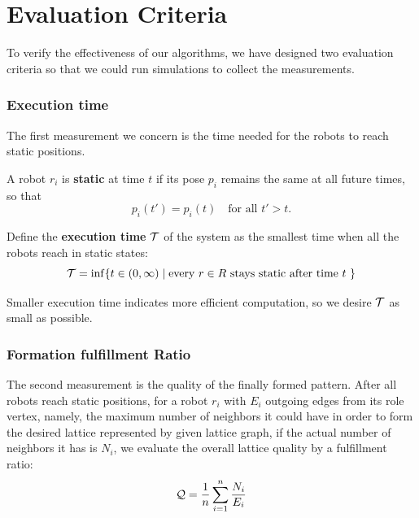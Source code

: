 \section{Evaluation Criteria}
\label{sec:mrf-eval}

To verify the effectiveness of our algorithms, we have designed two evaluation criteria so that we could run simulations to collect the measurements.

\subsubsection{Execution time}
The first measurement we concern is the time needed for the robots to reach static positions.

\begin{defn}
A robot $r_i$ is \textbf{static} at time $t$ if its pose $p_i$
remains the same at all future times, so that 
  \begin{equation}
    p_i(t') = p_i(t) \quad \mbox {for all } t' > t.
  \end{equation}
\end{defn}

Define the \textbf{execution time} $\mathcal{T}$ of the system as the smallest time when all the robots reach in static states:
\begin{equation}
  \mathcal{T} = \inf \{t \in (0, \infty) \mid \mbox{every $r \in R$ stays static
    after time $t$ } \}
\end{equation}

Smaller execution time indicates more efficient computation, so we desire $\mathcal{T}$ as small as possible.

\subsubsection{Formation fulfillment Ratio}

The second measurement is the quality of the finally formed pattern.
%
After all robots reach static positions, for a robot $r_i$
with $E_i$ outgoing edges from its role vertex, 
namely, the maximum number of neighbors it could have in order to form the desired lattice represented by given lattice graph, if the actual number of neighbors it has is $N_i$, 
we evaluate the overall lattice quality by a fulfillment ratio:
\begin{equation}\label{eq:gamma}
  \mathcal{Q} = \dfrac{1}{n}\sum\limits_{i=1}^n \frac{N_i}{E_i}
\end{equation}

